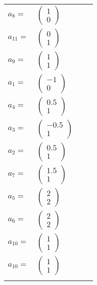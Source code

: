 \documentclass[1p]{elsarticle_modified}
\theoremstyle{definition}
\begin{document}
\begin{tabular}{m{7pt} m{180pt} m{7pt} m{180pt} }
\flushright $a_{8}=$&$\begin{pmatrix}1\\0\end{pmatrix}$ \\
\flushright $a_{11}=$&$\begin{pmatrix}0\\1\end{pmatrix}$ \\
\flushright $a_{9}=$&$\begin{pmatrix}1\\1\end{pmatrix}$ \\
\flushright $a_{1}=$&$\begin{pmatrix}-1\\0\end{pmatrix}$ \\
\flushright $a_{4}=$&$\begin{pmatrix}0.5\\1\end{pmatrix}$ \\
\flushright $a_{3}=$&$\begin{pmatrix}-0.5\\1\end{pmatrix}$ \\
\flushright $a_{2}=$&$\begin{pmatrix}0.5\\1\end{pmatrix}$ \\
\flushright $a_{7}=$&$\begin{pmatrix}1.5\\1\end{pmatrix}$ \\
\flushright $a_{5}=$&$\begin{pmatrix}2\\2\end{pmatrix}$ \\
\flushright $a_{6}=$&$\begin{pmatrix}2\\2\end{pmatrix}$ \\
\flushright $a_{10}=$&$\begin{pmatrix}1\\1\end{pmatrix}$\\ \flushright $a_{10}=$&$\begin{pmatrix}1\\1\end{pmatrix}$\\&\end{tabular}
\end{document}
